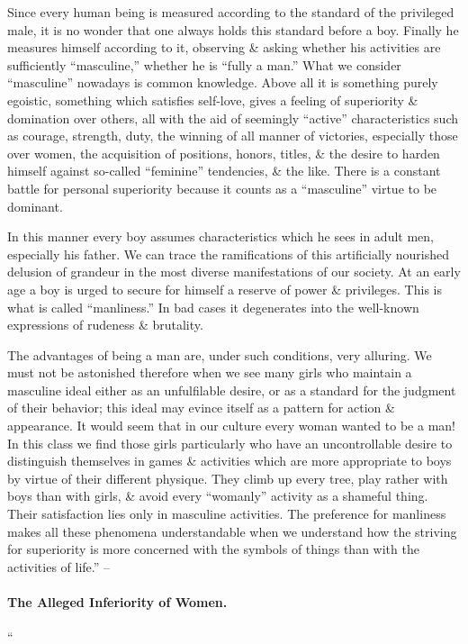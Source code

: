 \documentclass{article}
\begin{document}
Since every human being is measured according to the standard of the privileged male, it is no wonder that one always holds this standard before a boy. Finally he measures himself according to it, observing \& asking whether his activities are sufficiently ``masculine,'' whether he is ``fully a man.'' What we consider ``masculine'' nowadays is common knowledge. Above all it is something purely egoistic, something which satisfies self-love, gives a feeling of superiority \& domination over others, all with the aid of seemingly ``active'' characteristics such as courage, strength, duty, the winning of all manner of victories, especially those over women, the acquisition of positions, honors, titles, \& the desire to harden himself against so-called ``feminine'' tendencies, \& the like. There is a constant battle for personal superiority because it counts as a ``masculine'' virtue to be dominant.

In this manner every boy assumes characteristics which he sees in adult men, especially his father. We can trace the ramifications of this artificially nourished delusion of grandeur in the most diverse manifestations of our society. At an early age a boy is urged to secure for himself a reserve of power \& privileges. This is what is called ``manliness.'' In bad cases it degenerates into the well-known expressions of rudeness \& brutality.

The advantages of being a man are, under such conditions, very alluring. We must not be astonished therefore when we see many girls who maintain a masculine ideal either as an unfulfilable desire, or as a standard for the judgment of their behavior; this ideal may evince itself as a pattern for action \& appearance. It would seem that in our culture every woman wanted to be a man! In this class we find those girls particularly who have an uncontrollable desire to distinguish themselves in games \& activities which are more appropriate to boys by virtue of their different physique. They climb up every tree, play rather with boys than with girls, \& avoid every ``womanly'' activity as a shameful thing. Their satisfaction lies only in masculine activities. The preference for manliness makes all these phenomena understandable when we understand how the striving for superiority is more concerned with the symbols of things than with the activities of life.'' -- \cite[pp. 122--129]{Adler_human_nature}

\paragraph{The Alleged Inferiority of Women.} ``
\end{document}
